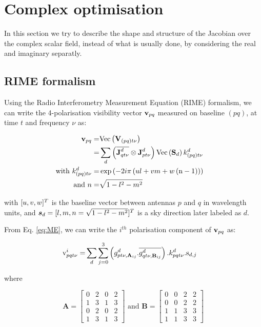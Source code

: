 \section{Complex optimisation}
\label{sec:Wirtinger}

In this section we try to describe the shape and structure of the
Jacobian over the complex scalar field, instead of what is usually done, by
considering the real and imaginary separatly. 


\subsection{RIME formalism}

Using the Radio Interferometry Measurement
Equation (RIME) formalism, we can write the 4-polarisation visibility
vector $\textbf{v}_{pq}$ measured on baseline
$(pq)$, at time $t$ and frequency $\nu$ as:


\begin{alignat}{2}
\label{eq:ME}
\textbf{v}_{pq}=&\text{Vec}\left(\textbf{V}_{(pq)t\nu}\right)&\\
=&\displaystyle\sum\limits_{d} \left(\overline{\textbf{J}^{d}_{qt\nu}}\otimes \textbf{J}^{d}_{pt\nu}\right)
\text{Vec}\left(\textbf{S}_d\right) k^{d}_{(pq)t\nu}\\
\text{with}\ k^{d}_{(pq)t\nu}=&\exp{\left(-2 i\pi
  \left(ul+vm+w\left(\text{n}-1\right)\right)\right)}\\
\text{and}\ n=&\sqrt{1-l^2-m^2}
\end{alignat}

\noindent with $[u,v,w]^T$ is the baseline vector between antennas
$p$ and $q$ in wavelength units, and
$\vec{s}_d=[\l,\m,\n=\sqrt{1-\l^2-\m^2}]^T$ is a sky direction later
labeled as $d$. 

From Eq. \ref{eq:ME}, we
can write the $i^{th}$ polarisation component of $\textbf{v}_{pq}$ as:

\begin{alignat}{2}
\mathrm{v}^i_{pqt\nu}=&
\displaystyle\sum\limits_{d}
\displaystyle\sum\limits_{j=0}^3 \left(g^{d}_{pt\nu,\textbf{A}_{ij}}.\overline{g^{d}_{qt\nu,\textbf{B}_{ij}}}\right).k^{d}_{pqt\nu}.\text{s}_{d,j}
\end{alignat}

\noindent where 

\begin{equation}
\textbf{A}=
\begin{bmatrix}
0 & 2 & 0 & 2 \\ 
1 & 3 & 1 & 3 \\ 
0 & 2 & 0 & 2 \\
1 & 3 & 1 & 3 
\end{bmatrix}
\text{ and }
\textbf{B}=
\begin{bmatrix}
0 & 0 & 2 & 2 \\ 
0 & 0 & 2 & 2 \\ 
1 & 1 & 3 & 3 \\
1 & 1 & 3 & 3 
\end{bmatrix}
\end{equation}


